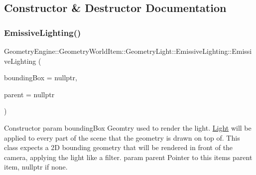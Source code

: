 \subsection{Constructor \& Destructor Documentation}
\mbox{\label{class_geometry_engine_1_1_geometry_world_item_1_1_geometry_light_1_1_emissive_lighting_a50dbde1e7a06662e05bd9732b040b845}} 
\subsubsection{\texorpdfstring{EmissiveLighting()}{EmissiveLighting()}\hspace{0.1cm}{\footnotesize\ttfamily [1/2]}}
{\footnotesize\ttfamily Geometry\+Engine\+::\+Geometry\+World\+Item\+::\+Geometry\+Light\+::\+Emissive\+Lighting\+::\+Emissive\+Lighting (\begin{DoxyParamCaption}\item[{\mbox{\hyperlink{class_geometry_engine_1_1_geometry_world_item_1_1_geometry_item_1_1_geometry_item}{Geometry\+Item\+::\+Geometry\+Item}} $\ast$}]{bounding\+Box = {\ttfamily nullptr},  }\item[{\mbox{\hyperlink{class_geometry_engine_1_1_geometry_world_item_1_1_world_item}{World\+Item}} $\ast$}]{parent = {\ttfamily nullptr} }\end{DoxyParamCaption})}

Constructor param bounding\+Box Geomtry used to render the light. \mbox{\hyperlink{class_geometry_engine_1_1_geometry_world_item_1_1_geometry_light_1_1_light}{Light}} will be applied to every part of the scene that the geometry is drawn on top of. This class expects a 2D bounding geometry that will be rendered in front of the camera, applying the light like a filter. param parent Pointer to this items parent item, nullptr if none. \mbox{\label{class_geometry_engine_1_1_geometry_world_item_1_1_geometry_light_1_1_emissive_lighting_aac76201e50ff6a2a62ec84225c7bffaa}} 
